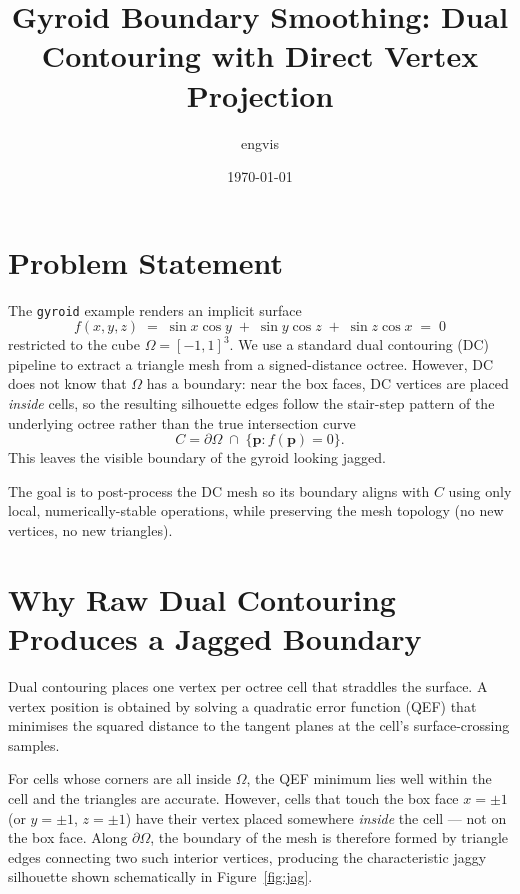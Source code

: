 \documentclass[11pt]{article}
\title{Gyroid Boundary Smoothing: Dual Contouring with Direct Vertex Projection}
\author{engvis}
\date{\today}
\begin{document}
\maketitle

\section{Problem Statement}

The \texttt{gyroid} example renders an implicit surface
\[
  f(x,y,z) \;=\; \sin x\cos y \;+\; \sin y\cos z \;+\; \sin z\cos x \;=\; 0
\]
restricted to the cube $\Omega = [-1,1]^3$.  We use a standard dual
contouring (DC) pipeline to extract a triangle mesh from a signed-distance
octree.  However, DC does not know that $\Omega$ has a boundary: near the
box faces, DC vertices are placed \emph{inside} cells, so the resulting
silhouette edges follow the stair-step pattern of the underlying octree
rather than the true intersection curve
\[
  C = \partial\Omega \;\cap\; \{\mathbf{p} : f(\mathbf{p}) = 0\}.
\]
This leaves the visible boundary of the gyroid looking jagged.

The goal is to post-process the DC mesh so its boundary aligns with $C$
using only local, numerically-stable operations, while preserving the
mesh topology (no new vertices, no new triangles).

\section{Why Raw Dual Contouring Produces a Jagged Boundary}

Dual contouring places one vertex per octree cell that straddles the
surface.  A vertex position is obtained by solving a quadratic error
function (QEF) that minimises the squared distance to the tangent planes
at the cell's surface-crossing samples.

For cells whose corners are all inside $\Omega$, the QEF minimum lies well
within the cell and the triangles are accurate.  However, cells that touch
the box face $x = \pm 1$ (or $y = \pm 1$, $z = \pm 1$) have their vertex
placed somewhere \emph{inside} the cell --- not on the box face.  Along
$\partial\Omega$, the boundary of the mesh is therefore formed by triangle
edges connecting two such interior vertices, producing the characteristic
jaggy silhouette shown schematically in Figure~\ref{fig:jag}.
\end{document}
